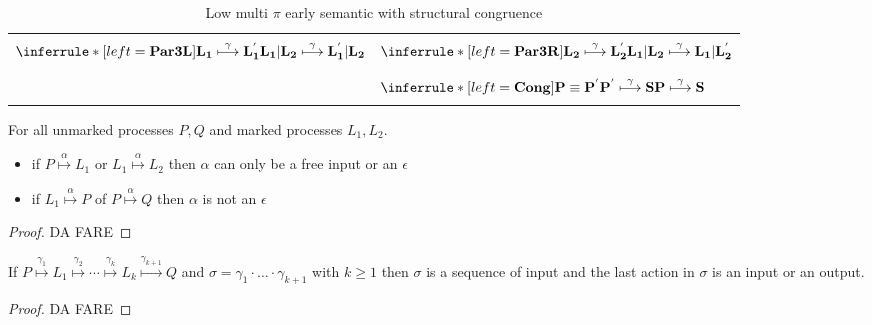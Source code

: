 \begin{definition}
\begin{table}
\begin{tabular}{ll}
      \\\\
	  $\inferrule* [left=\bf{Par3L}]{
	      L_{1} \stackrel{\gamma}{\longmapsto} L_{1}^{'}
	  }{
	      L_{1}|L_{2} \stackrel{\gamma}{\longmapsto} L_{1}^{'}|L_{2}
	  }$
	&
	  $\inferrule* [left=\bf{Par3R}]{
	      L_{2} \stackrel{\gamma}{\longmapsto} L_{2}^{'}
	  }{
	      L_{1}|L_{2} \stackrel{\gamma}{\longmapsto} L_{1}|L_{2}^{'}
	  }$
      \\\\\\
	&
	  $\inferrule* [left=\bf{Cong}]{
	      P\equiv P^{'}
	    \\
	      P^{'} \stackrel{\gamma}{\longmapsto} S
	  }{
	      P \stackrel{\gamma}{\longmapsto} S
	  }$
      \\\\\hline
    \end{tabular}
    \caption{Low multi $\pi$ early semantic with structural congruence}
    \label{lowleveltransitionrelation}
  \end{table}
\end{definition}



\begin{lemma}\label{lemmacom3}
  For all unmarked processes $P,Q$ and marked processes $L_{1}, L_{2}$.
  \begin{itemize}
    \item
      if $P\stackrel{\alpha}{\longmapsto}L_{1}$ or $L_{1}\stackrel{\alpha}{\longmapsto}L_{2}$ then $\alpha$ can only be a free input or an $\epsilon$
    \item
      if $L_{1}\stackrel{\alpha}{\longmapsto}P$ of $P\stackrel{\alpha}{\longmapsto}Q$ then $\alpha$ is not an $\epsilon$
  \end{itemize}
  \begin{proof}
    DA FARE
  \end{proof}
\end{lemma}


\begin{lemma}\label{lemmalabellowhigh}
  If $P\stackrel{\gamma_{1}}{\longmapsto} L_{1} \stackrel{\gamma_{2}}{\longmapsto} \cdots  \stackrel{\gamma_{k}}{\longmapsto} L_{k} \stackrel{\gamma_{k+1}}{\longmapsto} Q$ and $\sigma = \gamma_{1}\cdot \ldots \cdot \gamma_{k+1}$ with $k\geq 1$ then $\sigma$ is a sequence of input and the last action in $\sigma$ is an input or an output.
  \begin{proof}
    DA FARE
  \end{proof}
\end{lemma}

